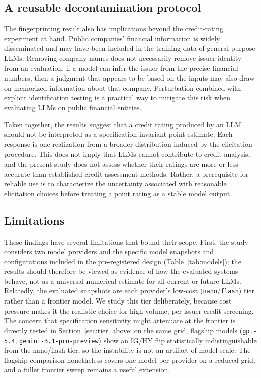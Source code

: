 \documentclass[a4paper,fleqn]{cas-sc}
\begin{document}
\subsection{A reusable decontamination protocol}
The fingerprinting result also has implications beyond the credit-rating experiment at hand. Public
companies' financial information is widely disseminated and may have been included in the training data
of general-purpose LLMs. Removing company names does not necessarily remove issuer identity from an
evaluation: if a model can infer the issuer from the precise financial numbers, then a judgment that
appears to be based on the inputs may also draw on memorized information about that company. Perturbation
combined with explicit identification testing is a practical way to mitigate this risk when evaluating
LLMs on public financial entities.

Taken together, the results suggest that a credit rating produced by an LLM should not be interpreted as a
specification-invariant point estimate. Each response is one realization from a broader distribution
induced by the elicitation procedure. This does not imply that LLMs cannot contribute to credit analysis,
and the present study does not assess whether their ratings are more or less accurate than established
credit-assessment methods. Rather, a prerequisite for reliable use is to characterize the uncertainty
associated with reasonable elicitation choices before treating a point rating as a stable model output.

\subsection{Limitations}
These findings have several limitations that bound their scope. First, the study considers two model
providers and the specific model snapshots and configurations included in the pre-registered design
(Table~\ref{tab:models}); the results should therefore be viewed as evidence of how the evaluated systems
behave, not as a universal numerical estimate for all current or future LLMs. Relatedly, the evaluated
snapshots are each provider's low-cost (\texttt{nano}/\texttt{flash}) tier rather than a frontier model.
We study this tier deliberately, because cost pressure makes it the realistic choice for high-volume,
per-issuer credit screening. The concern that specification sensitivity might attenuate at the frontier
is directly tested in Section~\ref{sec:tier} above: on the same grid, flagship models
(\texttt{gpt-5.4}, \texttt{gemini-3.1-pro-preview}) show an IG/HY flip statistically indistinguishable
from the nano/flash tier, so the instability is not an artifact of model scale. The flagship comparison
nonetheless covers one model per provider on a reduced grid, and a fuller frontier sweep remains a useful
extension.
\end{document}
